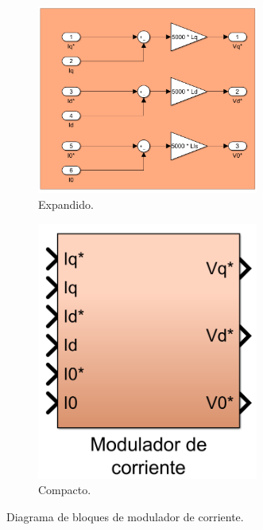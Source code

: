 \documentclass{article}
\begin{document}
\begin{figure}[H]
    \begin{subfigure}[b]{0.75\textwidth}
        \centering
        \includegraphics[width=0.8\textwidth]{modulador_de_corriente_extendido.png}
        \caption{Expandido.}
    \end{subfigure}
    \begin{subfigure}[b]{0.24\textwidth}
        \centering
        \includegraphics[width=0.8\textwidth]{modulador_de_corriente.png}
        \caption{Compacto.}
    \end{subfigure}
    \caption{Diagrama de bloques de modulador de corriente.}
\end{figure}
\end{document}
